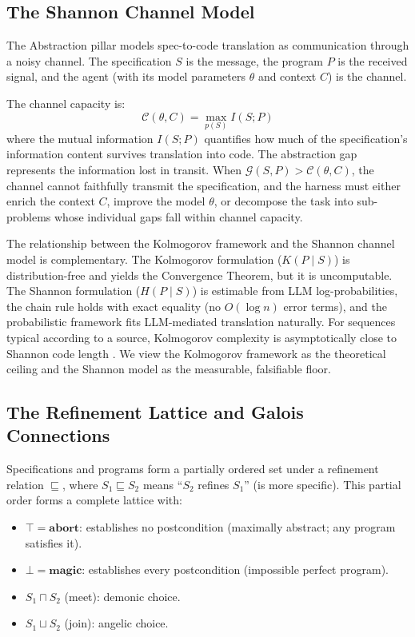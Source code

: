 \documentclass[11pt, a4paper]{googledeepmind}
\begin{document}
\subsection{The Shannon Channel Model}

The Abstraction pillar models spec-to-code translation as communication through a noisy channel. The specification $S$ is the message, the program $P$ is the received signal, and the agent (with its model parameters $\theta$ and context $C$) is the channel.

The channel capacity is:
\begin{equation}
    \mathcal{C}(\theta, C) = \max_{p(S)} I(S; P)
\end{equation}
where the mutual information $I(S; P)$ quantifies how much of the specification's information content survives translation into code. The abstraction gap represents the information lost in transit. When $\mathcal{G}(S, P) > \mathcal{C}(\theta, C)$, the channel cannot faithfully transmit the specification, and the harness must either enrich the context $C$, improve the model $\theta$, or decompose the task into sub-problems whose individual gaps fall within channel capacity.

The relationship between the Kolmogorov framework and the Shannon channel model is complementary. The Kolmogorov formulation ($K(P \mid S)$) is distribution-free and yields the Convergence Theorem, but it is uncomputable. The Shannon formulation ($H(P \mid S)$) is estimable from LLM log-probabilities, the chain rule holds with exact equality (no $O(\log n)$ error terms), and the probabilistic framework fits LLM-mediated translation naturally. For sequences typical according to a source, Kolmogorov complexity is asymptotically close to Shannon code length \citep{vitanyi2004shannon}. We view the Kolmogorov framework as the theoretical ceiling and the Shannon model as the measurable, falsifiable floor.

\subsection{The Refinement Lattice and Galois Connections}

Specifications and programs form a partially ordered set under a refinement relation $\sqsubseteq$, where $S_1 \sqsubseteq S_2$ means ``$S_2$ refines $S_1$'' (is more specific). This partial order forms a complete lattice \citep{back1980correctness, morgan1994programming} with:

\begin{itemize}[nosep]
    \item $\top = \mathbf{abort}$: establishes no postcondition (maximally abstract; any program satisfies it).
    \item $\bot = \mathbf{magic}$: establishes every postcondition (impossible perfect program).
    \item $S_1 \sqcap S_2$ (meet): demonic choice.
    \item $S_1 \sqcup S_2$ (join): angelic choice.
\end{itemize}
\end{document}
